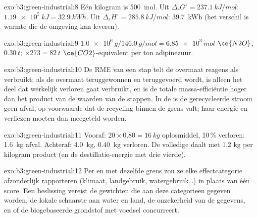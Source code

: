 \begin{solution}{exo:b3:green-industrial:8}
Eén kilogram is \qty{500}{mol}. Uit $\Delta_rG^\circ = \qty{237.1}{kJ/mol}$: $\qty{1.19e5}{kJ} = \qty{32.9}{kWh}$. Uit $\Delta_rH^\circ = \qty{285.8}{kJ/mol}$: \qty{39.7}{kWh}
(het verschil is warmte die de omgeving kan leveren).
\end{solution}

\begin{solution}{exo:b3:green-industrial:9}
$\qty{1.0e6}{g}/\qty{146.0}{g/mol} = \qty{6.85e3}{mol}$ $\ce{N2O}$, $\qty{0.30}{t}$; $\times 273 = \qty{82}{t}$ $\ce{CO2}$-equivalent per ton adipinezuur.
\end{solution}

\begin{solution}{exo:b3:green-industrial:10}
De RME van een stap telt de overmaat reagens als verbruikt; als de
overmaat teruggewonnen en teruggevoerd wordt, is alleen het deel dat
werkelijk verloren gaat verbruikt, en is de totale massa-efficiëntie
hoger dan het product van de waarden van de stappen. In de  is
de gerecycleerde stroom geen afval, op voorwaarde dat de recycling
binnen de grens valt; haar energie en verliezen moeten dan meegeteld
worden.
\end{solution}

\begin{solution}{exo:b3:green-industrial:11}
Vooraf: $20 \times 0.80 = \qty{16}{kg}$ oplosmiddel, 10\,\% verloren: \qty{1.6}{kg} afval. Achteraf: \qty{4.0}{kg}, \qty{0.40}{kg} verloren. De
volledige  daalt met 1.2 kg per kilogram product (en de
destillatie-energie met drie vierde).
\end{solution}

\begin{solution}{exo:b3:green-industrial:12}
Per  en met dezelfde grens zou ze elke
effectcategorie afzonderlijk rapporteren (klimaat, landgebruik,
watergebruik\dots) in plaats van één score. Een beslissing vereist de
gewichten die aan deze categorieën gegeven worden, de lokale schaarste
aan water en land, de onzekerheid van de gegevens, en of de biogebaseerde
grondstof met voedsel concurreert.
\end{solution}

